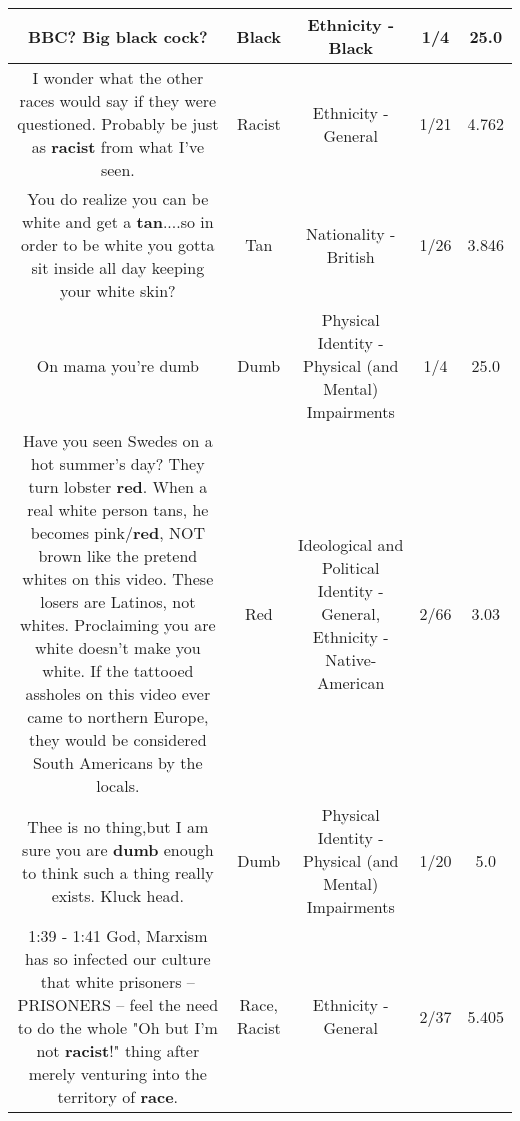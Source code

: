 \documentclass[11pt]{article}
\newlength\mylength
\begin{document}
\begin{center}
\begin{longtable}{|C{.65\mylength}|C{.30\mylength}|C{.12\mylength}|C{.12\mylength}|C{.12\mylength}|}
  \small BBC? Big \textbf{black} cock?\normalsize   & Black & Ethnicity - Black & 1/4 & 25.0 \\  \hline
  \small I wonder what the other races would say if they were questioned. Probably be just as \textbf{racist} from what I've seen.\normalsize   & Racist & Ethnicity - General & 1/21 & 4.762 \\  \hline
  \small You do realize you can be white and get a \textbf{tan}....so in order to be white you gotta sit inside all day keeping your white skin?\normalsize   & Tan & Nationality - British & 1/26 & 3.846 \\  \hline
  \small On mama you're dumb\normalsize   & Dumb & Physical Identity - Physical (and Mental) Impairments & 1/4 & 25.0 \\  \hline
  \small Have you seen Swedes on a hot summer's day? They turn lobster \textbf{r\textbf{ed}}. When a real white person tans, he becomes pink/\textbf{r\textbf{ed}}, NOT brown like the pretend whites on this video. These losers are Latinos, not whites. Proclaiming you are white doesn't make you white. If the tattooed assholes on this video ever came to northern Europe, they would be considered South Americans by the locals.\normalsize   & Red &  Ideological and Political Identity - General, Ethnicity - Native-American & 2/66 & 3.03 \\  \hline
  \small Thee is no thing,but I am sure you are \textbf{dumb} enough to think such a thing really exists. Kluck head.\normalsize   & Dumb & Physical Identity - Physical (and Mental) Impairments & 1/20 & 5.0 \\  \hline
  \small 1:39 - 1:41 God, Marxism has so infected our culture that white prisoners -- PRISONERS -- feel the need to do the whole "Oh but I'm not \textbf{racist}!" thing after merely venturing into the territory of \textbf{race}.\normalsize   & Race, Racist & Ethnicity - General & 2/37 & 5.405 \\  \hline

\end{longtable}
\end{center}
\end{document}
